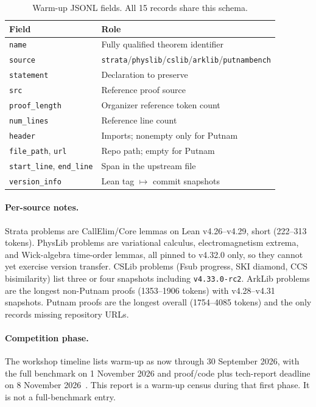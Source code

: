 \documentclass{article}
\begin{document}
\begin{table}[ht]
  \caption{Warm-up JSONL fields. All 15 records share this schema.}
  \label{schema-table}
  \centering
  \small
  \begin{tabular}{ll}
    \toprule
    Field & Role \\
    \midrule
    \texttt{name} & Fully qualified theorem identifier \\
    \texttt{source} & \texttt{strata}/\texttt{physlib}/\texttt{cslib}/\texttt{arklib}/\texttt{putnambench} \\
    \texttt{statement} & Declaration to preserve \\
    \texttt{src} & Reference proof source \\
    \texttt{proof\_length} & Organizer reference token count \\
    \texttt{num\_lines} & Reference line count \\
    \texttt{header} & Imports; nonempty only for Putnam \\
    \texttt{file\_path}, \texttt{url} & Repo path; empty for Putnam \\
    \texttt{start\_line}, \texttt{end\_line} & Span in the upstream file \\
    \texttt{version\_info} & Lean tag $\mapsto$ commit snapshots \\
    \bottomrule
  \end{tabular}
\end{table}

\paragraph{Per-source notes.} Strata problems are CallElim/Core lemmas on Lean v4.26--v4.29, short (222--313 tokens). PhysLib problems are variational calculus, electromagnetism extrema, and Wick-algebra time-order lemmas, all pinned to v4.32.0 only, so they cannot yet exercise version transfer. CSLib problems (Fsub progress, SKI diamond, CCS bisimilarity) list three or four snapshots including \texttt{v4.33.0-rc2}. ArkLib problems are the longest non-Putnam proofs (1353--1906 tokens) with v4.28--v4.31 snapshots. Putnam proofs are the longest overall (1754--4085 tokens) and the only records missing repository URLs.

\paragraph{Competition phase.} The workshop timeline lists warm-up as now through 30 September 2026, with the full benchmark on 1 November 2026 and proof/code plus tech-report deadline on 8 November 2026~\cite{vericodegen2026}. This report is a warm-up census during that first phase. It is not a full-benchmark entry.
\end{document}
